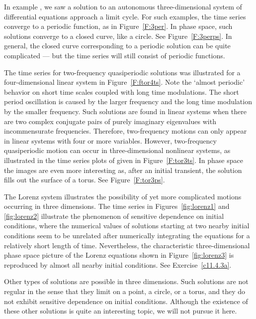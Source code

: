 \documentclass{ximera}
\begin{document}
In example , we saw a solution to an autonomous three-dimensional 
system of differential equations approach a limit cycle.  For such 
examples, the time series converge to a periodic function, as in 
Figure~\ref{F:3per}.  In phase space, such solutions converge to a closed 
curve, like a circle.  See Figure~\ref{F:3perps}.   In general, the closed 
curve corresponding to a periodic solution can be quite complicated --- but 
the time series will still consist of periodic functions.

The time series for two-frequency quasiperiodic solutions was illustrated for
a four-dimensional linear system in Figure~\ref{F:ftor4ts}.  Note the `almost 
periodic' behavior on short time scales coupled with long time modulations.
The short period oscillation is caused by the larger frequency and the long 
time modulation by the smaller frequency.  Such solutions are found in linear 
systems when there are two complex conjugate pairs of purely imaginary 
eigenvalues with incommensurate frequencies.  Therefore, two-frequency 
motions can only appear in linear systems with four or more variables.  
However, two-frequency quasiperiodic motion can occur in three-dimensional 
nonlinear systems, as illustrated in the time series plots of  
given in Figure~\ref{F:tor3ts}.  In phase space the images are even more 
interesting as, after an initial transient, the solution fills out the 
surface of a torus.  See Figure~\ref{F:tor3ps}.

The Lorenz system  illustrates the possibility of yet more 
complicated motions occurring in three dimensions.  The time series in 
Figures~\ref{fig:lorenz1} and \ref{fig:lorenz2} illustrate the phenomenon of 
sensitive dependence on initial conditions, where the numerical values of 
solutions starting at two nearby initial conditions seem to be unrelated 
after numerically integrating the equations for a relatively short length of 
time.  Nevertheless, the characteristic three-dimensional phase space picture 
of the Lorenz equations shown in Figure~\ref{fig:lorenz3} is reproduced by 
almost all nearby initial conditions.  See Exercise~\ref{c11.4.3a}.
 
Other types of solutions are possible in three dimensions.  Such solutions
are not regular in the sense that they limit on a point, a circle, or a
torus, and they do not exhibit sensitive dependence on initial conditions.  
Although the existence of these other solutions is quite an interesting
topic, we will not pursue it here. 
\end{document}
